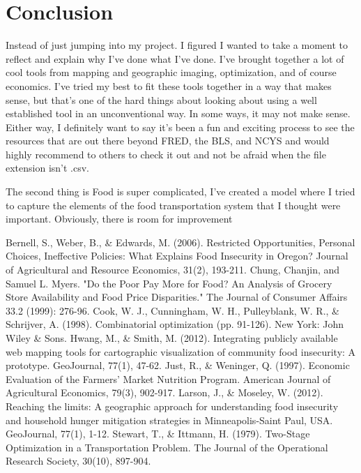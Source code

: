 \documentclass{report}
\begin{document}
\chapter{Conclusion}
Instead of just jumping into my project. I figured I wanted to take a moment to reflect and explain why I've done what I've done. I've brought together a lot of cool tools from mapping and geographic imaging, optimization, and of course economics. I've tried my best to fit these tools together in a way that makes sense, but that's one of the hard things about looking about using a well established tool in an unconventional way. In some ways, it may not make sense. Either way, I definitely want to say it's been a fun and exciting process to see the resources that are out there beyond FRED, the BLS, and NCYS and would highly recommend to others to check it out and not be afraid when the file extension isn't .csv.

The second thing is Food is super complicated, I've created a model where I tried to capture the elements of the food transportation system that I thought were important. Obviously, there is room for improvement

\pagebreak

\begin{thebibliography}{99}
Bernell, S., Weber, B., {\&} Edwards, M. (2006). Restricted Opportunities, Personal Choices, Ineffective Policies: What Explains Food Insecurity in Oregon? Journal of Agricultural and Resource Economics, 31(2), 193-211. 
 Chung, Chanjin, and Samuel L. Myers. "Do the Poor Pay More for Food? An Analysis of Grocery Store Availability and Food Price Disparities." The Journal of Consumer Affairs 33.2 (1999): 276-96.
 Cook, W. J., Cunningham, W. H., Pulleyblank, W. R.,  {\&}  Schrijver, A. (1998). Combinatorial optimization (pp. 91-126). New York: John Wiley  {\&}  Sons.
 Hwang, M., {\&} Smith, M. (2012). Integrating publicly available web mapping tools for cartographic visualization of community food insecurity: A prototype. GeoJournal, 77(1), 47-62.
 Just, R., {\&} Weninger, Q. (1997). Economic Evaluation of the Farmers' Market Nutrition Program. American Journal of Agricultural Economics, 79(3), 902-917.
 Larson, J., {\&} Moseley, W. (2012). Reaching the limits: A geographic approach for understanding food insecurity and household hunger mitigation strategies in Minneapolis-Saint Paul, USA. GeoJournal, 77(1), 1-12.
 Stewart, T., {\&} Ittmann, H. (1979). Two-Stage Optimization in a Transportation Problem. The Journal of the Operational Research Society, 30(10), 897-904.



\end{thebibliography}
\end{document}
